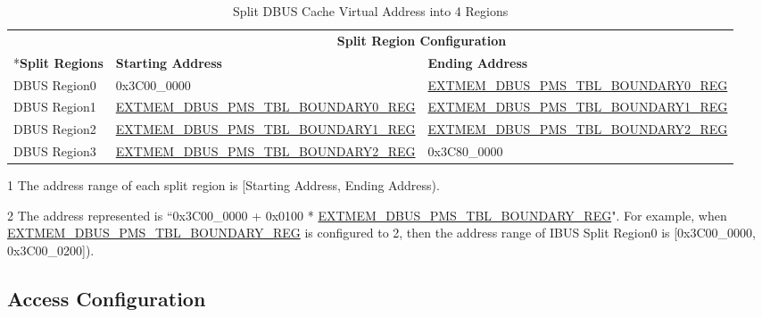\documentclass[main\_\_EN.tex]{subfiles}
\begin{document}
\begin{table}[H]
    \centering
    \caption{Split DBUS Cache Virtual Address into 4 Regions}
    \label{tab:dbus_acs_cache_region_config}
    \begin{threeparttable}
    \begin{tabular}{ | l | l | l |}
    \hline
        \rowcolor{lightgray}
         & \multicolumn{2}{c|}{\textbf{Split Region Configuration}} \\\cline{2-3}
        \rowcolor{lightgray}
        \multirow{-2}*{\textbf{Split Regions}\tnote{1}} & \textbf{Starting Address} & \textbf{Ending Address}\\\hline
        DBUS Region0  & 0x3C00\_0000                                                                          & \hyperref[regdesc:EXTMEMDBUSPMSTBLBOUNDARY0REG]{EXTMEM\_DBUS\_PMS\_TBL\_BOUNDARY0\_REG}\tnote{2} \\\hline
        DBUS Region1  & \hyperref[regdesc:EXTMEMDBUSPMSTBLBOUNDARY0REG]{EXTMEM\_DBUS\_PMS\_TBL\_BOUNDARY0\_REG}\tnote{2} & \hyperref[regdesc:EXTMEMDBUSPMSTBLBOUNDARY1REG]{EXTMEM\_DBUS\_PMS\_TBL\_BOUNDARY1\_REG}\tnote{2} \\\hline
        DBUS Region2  & \hyperref[regdesc:EXTMEMDBUSPMSTBLBOUNDARY1REG]{EXTMEM\_DBUS\_PMS\_TBL\_BOUNDARY1\_REG}\tnote{2} & \hyperref[regdesc:EXTMEMDBUSPMSTBLBOUNDARY2REG]{EXTMEM\_DBUS\_PMS\_TBL\_BOUNDARY2\_REG}\tnote{2} \\\hline
        DBUS Region3 & \hyperref[regdesc:EXTMEMDBUSPMSTBLBOUNDARY2REG]{EXTMEM\_DBUS\_PMS\_TBL\_BOUNDARY2\_REG}\tnote{2} & 0x3C80\_0000 \\\hline
    \end{tabular}
    \begin{tablenotes}
        \item[1] The address range of each split region is [Starting Address, Ending Address).
        \item[2] The address represented is ``0x3C00\_0000 + 0x0100 * \hyperref[regdesc:EXTMEMDBUSPMSTBLBOUNDARY1REG]{EXTMEM\_DBUS\_PMS\_TBL\_BOUNDARY\_REG}". For example, when \hyperref[regdesc:EXTMEMDBUSPMSTBLBOUNDARY1REG]{EXTMEM\_DBUS\_PMS\_TBL\_BOUNDARY\_REG} is configured to 2, then the address range of IBUS Split Region0 is [0x3C00\_0000, 0x3C00\_0200]).
        \end{tablenotes}
    \end{threeparttable}
\end{table}


\subsection{Access Configuration}
\end{document}
